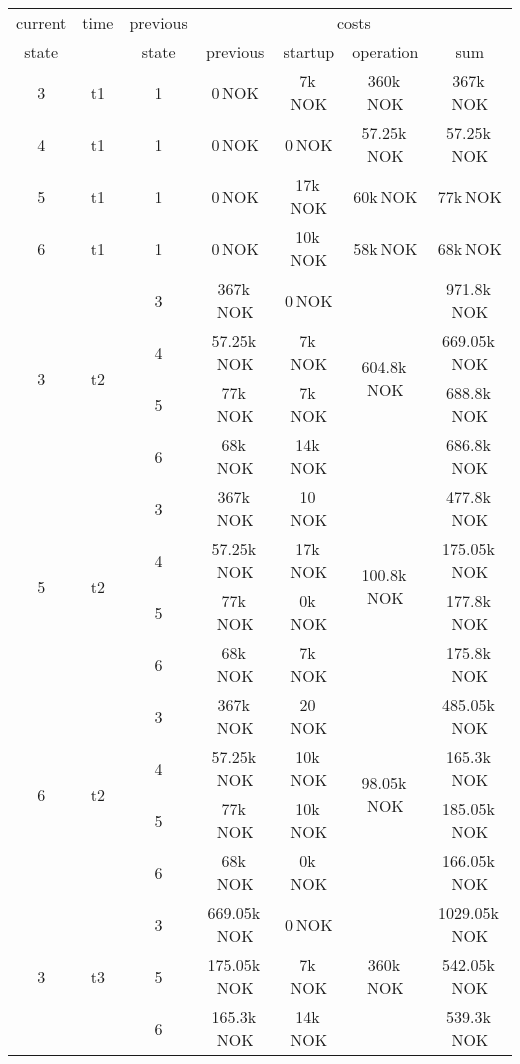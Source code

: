 \documentclass{article}
\begin{document}
	\begin{table}[hbt!]
\begin{center}
\begin{tabular}[h]{|c|c|c||c|c|c||c|}
\hline
current & time & previous   & \multicolumn{4}{|c|}{costs}\\
\cline{4-7}
state  		&      	&  state    &   previous    	&    startup   		& operation 		&  sum \\
\hline
\hline
 3			&	t1	&	1		&		0\,NOK		&	7k\,NOK			&	360k\,NOK		& 367k\,NOK\\
\hline
 4			&	t1	&	1		&		0\,NOK		&	0\,NOK			&	57.25k\,NOK		& 57.25k\,NOK\\
\hline
 5			&	t1	&	1		&		0\,NOK		&	17k\,NOK		&	60k\,NOK		& 77k\,NOK\\
\hline
 6			&	t1	&	1		&		0\,NOK		&	10k\,NOK		&	58k\,NOK		& 68k\,NOK\\
\hline
\hline
\multirow{4}{*}{3} & \multirow{4}{*}{t2} 
	&	3		&		367k\,NOK	&	0\,NOK			&	\multirow{4}{*}{604.8k\,NOK}		&	971.8k\,NOK\\
&	&	4		&		57.25k\,NOK	&	7k\,NOK			&										&	669.05k\,NOK\\
&	&	5		&		77k\,NOK	&	7k\,NOK			&										&	688.8k\,NOK\\
&	&	6		&		68k\,NOK	&	14k\,NOK		&										&	686.8k\,NOK\\
\hline
\multirow{4}{*}{5} & \multirow{4}{*}{t2}	
	&	3		&		367k\,NOK	&	10\,NOK			&	\multirow{4}{*}{100.8k\,NOK}		&	477.8k\,NOK\\
&	&	4		&		57.25k\,NOK	&	17k\,NOK		&										&	175.05k\,NOK\\
&	&	5		&		77k\,NOK	&	0k\,NOK			&										&	177.8k\,NOK\\
&	&	6		&		68k\,NOK	&	7k\,NOK			&										&	175.8k\,NOK\\
\hline
\multirow{4}{*}{6} & \multirow{4}{*}{t2}	
	&	3		&		367k\,NOK	&	20\,NOK			&	\multirow{4}{*}{98.05k\,NOK}		&	485.05k\,NOK\\
&	&	4		&		57.25k\,NOK	&	10k\,NOK		&										&	165.3k\,NOK\\
&	&	5		&		77k\,NOK	&	10k\,NOK		&										&	185.05k\,NOK\\
&	&	6		&		68k\,NOK	&	0k\,NOK			&										&	166.05k\,NOK\\
\hline
\hline
\multirow{3}{*}{3} & \multirow{3}{*}{t3}	
	&	3		&		669.05k\,NOK	&	0\,NOK			&	\multirow{3}{*}{360k\,NOK}			&	1029.05k\,NOK\\
&	&	5		&		175.05k\,NOK	&	7k\,NOK			&										&	542.05k\,NOK\\
&	&	6		&		165.3k\,NOK		&	14k\,NOK		&										&	539.3k\,NOK\\

\end{tabular}
\end{center}
\end{table}
\end{document}
